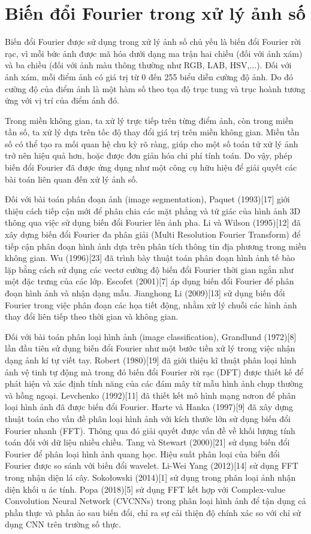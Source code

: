 \section{Biến đổi Fourier trong xử lý ảnh số}
Biến đổi Fourier được sử dụng trong xử lý ảnh số chủ yếu là biến đổi Fourier rời rạc, vì mỗi bức ảnh được mã hóa dưới dạng ma trận hai chiều (đối với ảnh xám) và ba chiều (đối với ảnh màu thông thường như RGB, LAB, HSV,...). Đối với ảnh xám, mỗi điểm ảnh có giá trị từ 0 đến 255 biểu diễn cường độ ảnh. Do đó cường độ của điểm ảnh là một hàm số theo tọa độ trục tung và trục hoành tương ứng với vị trí của điểm ảnh đó.
\par Trong miền không gian, ta xử lý trực tiếp trên từng điểm ảnh, còn trong miền tần số, ta xử lý dựa trên tốc độ thay đổi giá trị trên miền không gian. Miền tần số có thể tạo ra mối quan hệ chu kỳ rõ ràng, giúp cho một số toán tử xử lý ảnh trở nên hiệu quả hơn, hoặc được đơn giản hóa chi phí tính toán. Do vậy, phép biến đổi Fourier đã được ứng dụng như một công cụ hữu hiệu để giải quyết các bài toán liên quan đến xử lý ảnh số.
\par Đối với bài toán phân đoạn ảnh (image segmentation), Paquet (1993)[17] giới thiệu cách tiếp cận mới để phân chia các mặt phẳng và tứ giác của hình ảnh 3D thông qua việc sử dụng biến đổi Fourier lên ảnh pha. Li và Wilson (1995)[12] đã xây dựng biến đổi Fourier đa phân giải (Multi Resolution Fourier Transform) để tiếp cận phân đoạn hình ảnh dựa trên phân tích thông tin địa phương trong miền không gian. Wu (1996)[23] đã trình bày thuật toán phân đoạn hình ảnh tế bào lặp bằng cách sử dụng các vectơ cường độ biến đổi Fourier thời gian ngắn như một đặc trưng của các lớp. Escofet (2001)[7] áp dụng biến đổi Fourier để phân đoạn hình ảnh và nhận dạng mẫu. Jianghong Li (2009)[13] sử dụng biến đổi Fourier trong việc phân đoạn các họa tiết động, nhằm xử lý chuỗi các hình ảnh thay đổi liên tiếp theo thời gian và không gian. 
\par Đối với bài toán phân loại hình ảnh (image classification), Grandlund (1972)[8] lần đầu tiên sử dụng biến đổi Fourier như một bước tiền xử lý trong việc nhận dạng ảnh kí tự viết tay. Robert (1980)[19] đã giới thiệu kĩ thuật phân loại hình ảnh vệ tinh tự động mà trong đó biến đổi Fourier rời rạc (DFT) được thiết kế để phát hiện và xác định tính năng của các đám mây từ mẫu hình ảnh chụp thường và hồng ngoại. Levchenko (1992)[11] đã thiết kết mô hình mạng nơron để phân loại hình ảnh đã được biến đổi Fourier. Harte và Hanka (1997)[9] đã xây dựng thuật toán cho vấn đề phân loại hình ảnh với kích thước lớn sử dụng biến đổi Fourier nhanh (FFT). Thông qua đó giải quyết được vấn đề về khối lượng tính toán đối với dữ liệu nhiều chiều. Tang và Stewart (2000)[21] sử dụng biến đổi Fourier để phân loại hình ảnh quang học. Hiệu suất phân loại của biến đổi Fourier được so sánh với biến đổi wavelet. Li-Wei Yang (2012)[14] sử dụng FFT trong nhận diện lá cây. Sokołowski (2014)[1] sử dụng trong phân loại ảnh nhận diện khối u ác tính. Popa (2018)[5] sử dụng FFT kết hợp với Complex-value Convolution Neural Network (CVCNNs) trong phân loại hình ảnh để tận dụng cả phần thực và phần ảo sau biến đổi, chỉ ra sự cải thiện độ chính xác so với chỉ sử dụng CNN trên trường số thực.
